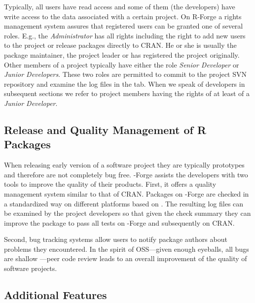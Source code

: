 

Typically, all users have read access and some of them (the
developers) have write access to the data associated with
a certain project. On R-Forge a rights management system assures that
registered users can be granted one of several roles. 
E.g., the \textit{Administrator} has all rights including the right to
add new users to the project or release packages directly to CRAN. He
or she is usually the package 
maintainer, the project leader or has registered the project originally.
Other members of a project typically have either the role \textit{Senior 
Developer} or \textit{Junior Developers}. These two roles are
permitted to commit to the project 
SVN repository and examine the log files in the  tab.
When we speak of developers in subsequent sections we refer to project
members having the rights of at least of a \textit{Junior Developer}.


\subsection{Release and Quality Management of R Packages}
\label{sec:release_and_quality_management}
When releasing early version of a software project they are typically
prototypes and therefore are 
not completely bug free. \R{}-Forge assists the developers with two
tools to improve the quality of their products. First, it offers a
quality management system similar to 
that of CRAN. Packages on \R{}-Forge are checked in a
standardized way on different platforms based on
. The resulting log files can be examined by the
project developers so that given the check summary they can improve
the package to pass all tests on \R{}-Forge and subsequently on CRAN.

Second, bug tracking systems allow users to notify
package authors about problems they encountered. In the spirit of
OSS---given enough eyeballs, all bugs are shallow
\citep{forge:Raymond:1999}---peer code review leads to an 
overall improvement of the quality of software projects.

\subsection{Additional Features}

